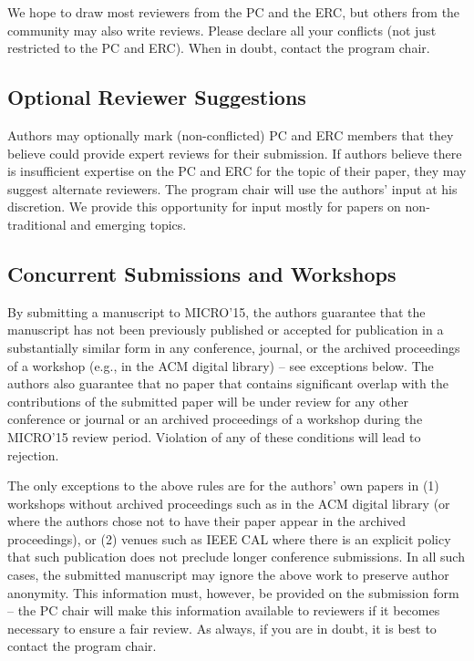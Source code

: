 \documentclass{sig-alternate}
\begin{document}
We hope to draw most reviewers from the PC and the ERC, but others from the
community may also write reviews.  Please declare all your conflicts (not
just restricted to the PC and ERC).  When in doubt, contact the program
chair.


\subsection{Optional Reviewer Suggestions}

Authors may optionally mark (non-conflicted) PC and ERC members that they
believe could provide expert reviews for their submission.  If authors
believe there is insufficient expertise on the PC and ERC for the topic of
their paper, they may suggest alternate reviewers.  The program chair will
use the authors' input at his discretion.  We provide this opportunity
for input mostly for papers on non-traditional and emerging topics.


\subsection{Concurrent Submissions and Workshops}

By submitting a manuscript to MICRO'15, the authors guarantee that the
manuscript has not been previously published or accepted for publication in
a substantially similar form in any conference, journal, or the archived
proceedings of a workshop (e.g., in the ACM digital library) -- see
exceptions below. The authors also guarantee that no paper that contains
significant overlap with the contributions of the submitted paper will be
under review for any other conference or journal or an archived proceedings
of a workshop during the MICRO'15 review period. Violation of any of these
conditions will lead to rejection.

The only exceptions to the above rules are for the authors' own papers
in (1) workshops without archived proceedings such as in the ACM
digital library (or where the authors chose not to have their paper
appear in the archived proceedings), or (2) venues such as IEEE CAL
where there is an explicit policy that such publication does not
preclude longer conference submissions.  In all such cases, the
submitted manuscript may ignore the above work to preserve author
anonymity. This information must, however, be provided on the
submission form -- the PC chair will make this information available
to reviewers if it becomes necessary to ensure a fair review.  As
always, if you are in doubt, it is best to contact the program chair.
\end{document}
